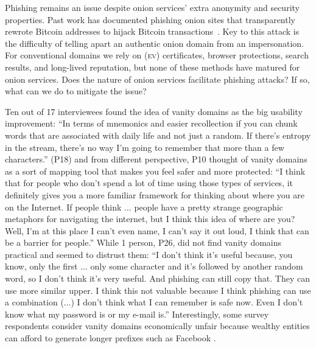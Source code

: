 Phishing remains an issue despite onion services' extra anonymity and security
properties.  Past work has documented phishing onion sites that transparently
rewrote Bitcoin addresses to hijack Bitcoin
transactions~\cite{Winter2016a,Nurmi2015a,Monteiro2016a}.  Key to this attack is
the difficulty of telling apart an authentic onion domain from an impersonation.
For conventional domains we rely on (\textsc{ev}) certificates, browser
protections, search results, and long-lived reputation, but none of these
methods have matured for onion services.  Does the nature of onion services
facilitate phishing attacks?  If so, what can we do to mitigate the issue?



Ten out of 17 interviewees found the idea of vanity domains as the big usability improvement: ``In terms of mnemonics and easier recollection if you can chunk words that are associated with daily life and not just a random. If there's entropy in the stream, there's no way I'm going to remember that more than a few characters.'' (P18) and from different perspective, P10 thought of vanity domains as a sort of mapping tool that makes you feel safer and more protected: ``I think that for people who don't spend a lot of time using those types of services, it definitely gives you a more familiar framework for thinking about where you are on the Internet. If people think ... people have a pretty strange geographic metaphors for navigating the internet, but I think this idea of where are you? Well, I'm at this place I can't even name, I can't say it out loud, I think that can be a barrier for people.'' While 1 person, P26, did not find vanity domains practical and seemed to distrust them: ``I don't think it's useful because, you know, only the first ... only some character and it's followed by another random word, so I don't think it's very useful. And phishing can still copy that. They can use more similar upper. I think this not valuable because I think phishing can use a combination (...) I don't think what I can remember is safe now. Even I don't know what my password is or my e-mail is.'' Interestingly, some  survey
respondents consider vanity domains economically unfair because wealthy entities
can afford to generate longer prefixes such as Facebook .


